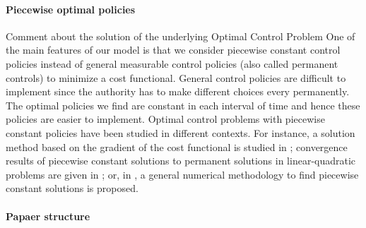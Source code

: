 \paragraph{Piecewise optimal policies}
        Comment about the solution of the underlying Optimal Control Problem
    One of the main features of our model is that we consider piecewise 
    constant control policies instead of general measurable control policies 
    (also called permanent controls) to minimize a cost functional. General 
    control policies are difficult to implement since the authority has to make 
    different choices every permanently. The optimal policies we find are 
    constant in each interval of time and hence these policies are easier to 
    implement. 
        Optimal control problems with piecewise constant policies have been 
    studied in different contexts. For instance, a solution method based on the 
    gradient of the cost functional is studied in \cite{MR3223602}; convergence 
    results of piecewise constant solutions to permanent solutions in 
    linear-quadratic problems are given in \cite{MR3627992}; or, in 
    \cite{CANTUNetAl}, a general numerical methodology to find piecewise 
    constant solutions is proposed. 
\paragraph{Papaer structure}